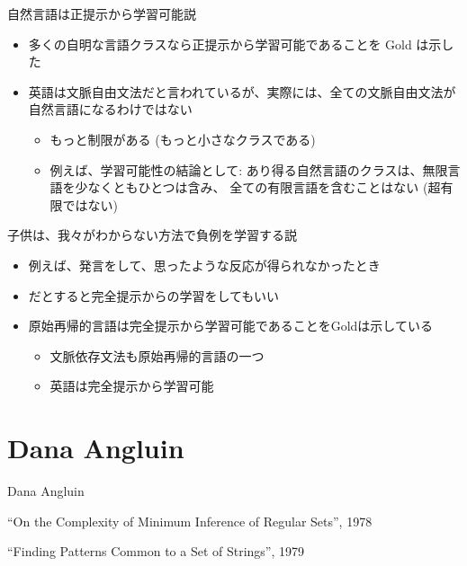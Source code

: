 \documentclass[professionalfont, 12pt, dvipdfmx, default, cjk]{beamer}
\begin{document}
\begin{frame}{自然言語は正提示から学習可能説}

\begin{itemize}
\itemsep1pt\parskip0pt
\item
  多くの自明な言語クラスなら正提示から学習可能であることを Gold は示した
\item
  英語は文脈自由文法だと言われているが、実際には、全ての文脈自由文法が自然言語になるわけではない

  \begin{itemize}
  \itemsep1pt\parskip0pt
  \item
    もっと制限がある (もっと小さなクラスである)
  \item
    例えば、学習可能性の結論として:
    あり得る自然言語のクラスは、無限言語を少なくともひとつは含み、
    全ての有限言語を含むことはない (超有限ではない)
  \end{itemize}
\end{itemize}

\end{frame}

\begin{frame}{子供は、我々がわからない方法で負例を学習する説}

\begin{itemize}
\itemsep1pt\parskip0pt
\item
  例えば、発言をして、思ったような反応が得られなかったとき
\item
  だとすると完全提示からの学習をしてもいい
\item
  原始再帰的言語は完全提示から学習可能であることをGoldは示している

  \begin{itemize}
  \itemsep1pt\parskip0pt
  \item
    文脈依存文法も原始再帰的言語の一つ
  \item
    英語は完全提示から学習可能
  \end{itemize}
\end{itemize}

\end{frame}

\section{Dana Angluin}\label{dana-angluin}

\begin{frame}{Dana Angluin}

\fontsize{19pt}{20pt} \selectfont
``On the Complexity of Minimum Inference of Regular Sets'', 1978

``Finding Patterns Common to a Set of Strings'', 1979

\end{frame}
\end{document}
